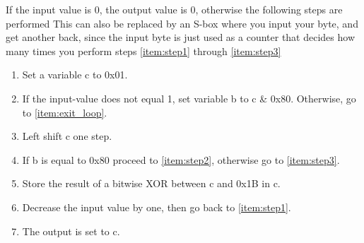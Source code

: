 If the input value is 0, the output value is 0, otherwise the 
following steps are performed \citep{AES:2001} %
This can also be replaced by an S-box where you input your byte, and 
get another back, since the input byte is just used as a counter that 
decides how many times you perform steps \ref{item:step1} through 
\ref{item:step3} 

\begin{enumerate}
\item Set a variable c to 0x01.
\item If the input-value does not equal 1, set variable b to c 
  \& 0x80. Otherwise, go to \ref{item:exit_loop}. 
  \label{item:step1}
\item Left shift c one step.
\item If b is equal to 0x80 proceed to \ref{item:step2}, otherwise go to
  \ref{item:step3}.
\item Store the result of a bitwise XOR between c and 0x1B in c.
  \label{item:step2}
\item Decrease the input value by one, then go back to  
  \ref{item:step1}.
  \label{item:step3}
\item The output is set to c.
  \label{item:exit_loop}
\end{enumerate}
